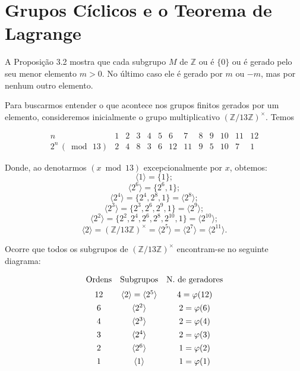 \section{Grupos Cíclicos e o Teorema de Lagrange}

A Proposição 3.2 mostra que cada subgrupo $M$ de $\mathbb{Z}$ ou é $\{0\}$ ou é gerado pelo 
seu menor elemento $m > 0$. No último caso ele é gerado por $m$ ou $-m$, mas por nenhum outro 
elemento.

Para buscarmos entender o que acontece nos grupos finitos gerados por um elemento, consideremos 
inicialmente o grupo multiplicativo $(\mathbb{Z}/13\mathbb{Z})^\times$. Temos

\[
\begin{array}{c|cccccccccccc}
n & 1 & 2 & 3 & 4 & 5 & 6 & 7 & 8 & 9 & 10 & 11 & 12 \\ \hline
2^n \,(\bmod\, 13) 
& 2 & 4 & 8 & 3 & 6 & 12 & 11 & 9 & 5 & 10 & 7 & 1
\end{array}
\]

Donde, ao denotarmos $(x \bmod 13)$ excepcionalmente por $x$, obtemos:
\[
\langle 1 \rangle = \{1\};
\]
\[
\langle 2^6 \rangle = \{2^6, 1\};
\]
\[
\langle 2^4 \rangle = \{2^4, 2^8, 1\} = \langle 2^8 \rangle;
\]
\[
\langle 2^3 \rangle = \{2^3, 2^6, 2^9, 1\} = \langle 2^9 \rangle;
\]
\[
\langle 2^2 \rangle = \{2^2, 2^4, 2^6, 2^8, 2^{10}, 1\} = \langle 2^{10} \rangle;
\]
\[
\langle 2 \rangle = (\mathbb{Z}/13\mathbb{Z})^\times = \langle 2^5 \rangle = \langle 2^7 \rangle = \langle 2^{11} \rangle.
\]

Ocorre que todos os subgrupos de $(\mathbb{Z}/13\mathbb{Z})^\times$ encontram-se no seguinte diagrama:

\[
\begin{array}{c c c}
\text{Ordens} & \text{Subgrupos} & \text{N.\ de geradores} \\[6pt]
12 & \langle 2 \rangle = \langle 2^5 \rangle & 4 = \varphi(12) \\[4pt]
6  & \langle 2^2 \rangle                  & 2 = \varphi(6)  \\[4pt]
4  & \langle 2^3 \rangle                  & 2 = \varphi(4)  \\[4pt]
3  & \langle 2^4 \rangle                  & 2 = \varphi(3)  \\[4pt]
2  & \langle 2^6 \rangle                  & 1 = \varphi(2)  \\[4pt]
1  & \langle 1 \rangle                    & 1 = \varphi(1)
\end{array}
\]

